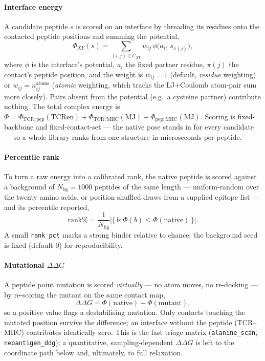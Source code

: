 \documentclass[11pt]{article}
\theoremstyle{oldplain}
\theoremstyle{oldrem}
\newcommand{\Cset}{\mathcal{C}}
\begin{document}
\paragraph{Interface energy} A candidate peptide $s$ is scored on an interface by threading its residues
onto the contacted peptide positions and summing the potential,
\begin{equation}\label{eq:score}
  \Phi_{XY}(s)=\!\!\sum_{(i,j)\in\Cset_{XY}}\!\! w_{ij}\,\phi\bigl(a_i,\,s_{\pi(j)}\bigr),
\end{equation}
where $\phi$ is the interface's potential, $a_i$ the fixed partner residue, $\pi(j)$ the contact's
peptide position, and the weight is $w_{ij}=1$ (default, \emph{residue} weighting) or
$w_{ij}=n^{\mathrm{atoms}}_{ij}$ (\emph{atomic} weighting, which tracks the LJ$+$Coulomb atom-pair sum
more closely). Pairs absent from the potential (e.g.\ a cysteine partner) contribute nothing. The total
complex energy is
$\Phi=\Phi_{\mathrm{TCR:pep}}(\text{TCRen})+\Phi_{\mathrm{TCR:MHC}}(\text{MJ})+\Phi_{\mathrm{pep:MHC}}(\text{MJ})$.
Scoring is fixed-backbone and fixed-contact-set --- the native pose stands in for every candidate --- so
a whole library ranks from one structure in microseconds per peptide.

\paragraph{Percentile rank} To turn a raw energy into a calibrated rank, the native peptide is scored
against a background of $N_{\mathrm{bg}}=1000$ peptides of the same length --- uniform-random over the
twenty amino acids, or position-shuffled draws from a supplied epitope list --- and its percentile
reported,
\begin{equation}\label{eq:rank}
  \mathrm{rank\%}=\frac{1}{N_{\mathrm{bg}}}\bigl|\{\,b:\Phi(b)\le\Phi(\text{native})\,\}\bigr| .
\end{equation}
A small \texttt{rank\_pct} marks a strong binder relative to chance; the background seed is fixed
(default $0$) for reproducibility.

\paragraph{Mutational $\Delta\Delta G$} A peptide point mutation is scored \emph{virtually} --- no atom
moves, no re-docking --- by re-scoring the mutant on the same contact map,
\begin{equation}\label{eq:ddg}
  \Delta\Delta G=\Phi(\text{native})-\Phi(\text{mutant}),
\end{equation}
so a positive value flags a destabilising mutation. Only contacts touching the mutated position survive
the difference; an interface without the peptide (TCR--MHC) contributes identically zero. This is the
fast triage matrix (\texttt{alanine\_scan}, \texttt{neoantigen\_ddg}); a quantitative,
sampling-dependent $\Delta\Delta G$ is left to the coordinate path below and, ultimately, to full
relaxation.
\end{document}
